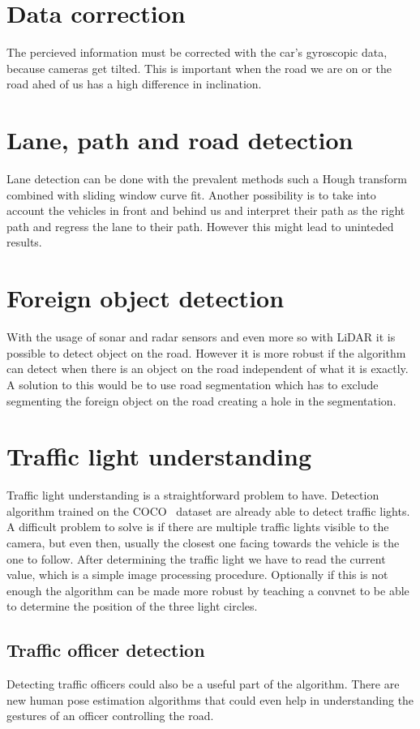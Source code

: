 \section{Data correction}
The percieved information must be corrected with the car's gyroscopic data,
because cameras get tilted. This is important when the road we are on or the
road ahed of us has a high difference in inclination.

\section{Lane, path and road detection}
Lane detection can be done with the prevalent methods such a Hough transform
combined with sliding window curve fit. Another possibility is to take into
account the vehicles in front and behind us and interpret their path as the
right path and regress the lane to their path. However this might lead to
uninteded results.

\section{Foreign object detection}
With the usage of sonar and radar sensors and even more so with LiDAR it is
possible to detect object on the road. However it is more robust if the
algorithm can detect when there is an object on the road independent of what it
is exactly. A solution to this would be to use road segmentation which has to
exclude segmenting the foreign object on the road creating a hole in the
segmentation. 

\section{Traffic light understanding}
Traffic light understanding is a straightforward problem to have. Detection
algorithm trained on the COCO~\cite{DBLP:journals/corr/LinMBHPRDZ14} dataset are
already able to detect traffic lights. A difficult problem to solve is if there
are multiple traffic lights visible to the camera, but even then, usually the
closest one facing towards the vehicle is the one to follow. After determining
the traffic light we have to read the current value, which is a simple image
processing procedure. Optionally if this is not enough the algorithm can be made
more robust by teaching a convnet to be able to determine the position of the
three light circles. 

\subsection{Traffic officer detection}
Detecting traffic officers could also be a useful part of the algorithm. There
are new human pose estimation algorithms that could even help in understanding
the gestures of an officer controlling the road.  

